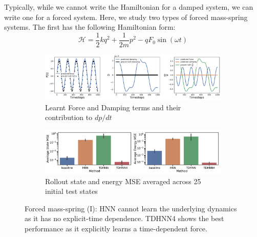 \documentclass{article}
\begin{document}
Typically, while we cannot write the Hamiltonian for a damped system, we can write one for a forced system. Here, we study two types of forced mass-spring systems. The first has the following Hamiltonian form:
\begin{equation}
\mathcal{H} = \frac{1}{2}kq^2 + \frac{1}{2m}p^2 - qF_0\sin(\omega t) 
\end{equation}
\begin{figure}[h!]
\centering
\captionsetup{justification=centering}
	\begin{subfigure}[b]{0.48\textwidth}
		\centering
		\includegraphics[width=\textwidth]{figures/figures/forced_mass_spring/1/forced_mass_spring_dpdt_0.pdf}
		\caption{Learnt Force and Damping terms and their contribution to $dp/dt$}
	\end{subfigure}
	\begin{subfigure}[b]{0.48\textwidth}
	    \centering
		\includegraphics[width=\textwidth]{figures/figures/forced_mass_spring/1/forced_mass_spring_errors_0.pdf}
		\caption{Rollout state and energy MSE averaged across 25 initial test states}
	\end{subfigure}
\caption{Forced mass-spring (I): HNN cannot learn the underlying dynamics as it has no explicit-time dependence. TDHNN4 shows the best performance as it explicitly learns a time-dependent force.}
\label{fig.fmspring1}
\end{figure}
\end{document}
